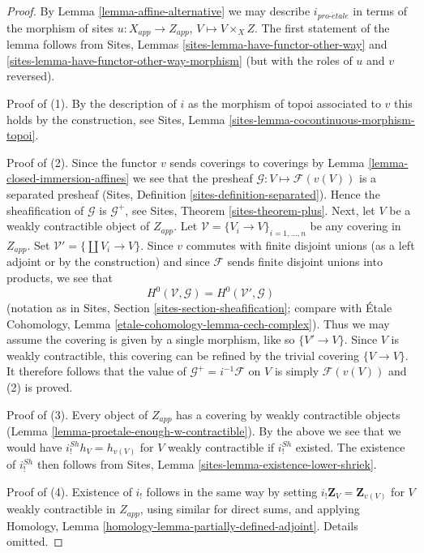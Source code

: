 \documentclass{stacks-project}
\theoremstyle{plain}
\theoremstyle{definition}
\theoremstyle{remark}
\numberwithin{equation}{subsection}
\def\proetale{{pro\text{-}\acute{e}tale}}
\begin{document}
\begin{proof}
By Lemma \ref{lemma-affine-alternative} we may describe $i_\proetale$ in terms
of the morphism of sites $u : X_{app} \to Z_{app}$, $V \mapsto V \times_X Z$.
The first statement of the lemma follows from
Sites, Lemmas \ref{sites-lemma-have-functor-other-way} and
\ref{sites-lemma-have-functor-other-way-morphism}
(but with the roles of $u$ and $v$ reversed).

\medskip\noindent
Proof of (1). By the description of $i$ as the morphism of topoi associated
to $v$ this holds by the construction, see
Sites, Lemma \ref{sites-lemma-cocontinuous-morphism-topoi}.

\medskip\noindent
Proof of (2). Since the functor $v$ sends coverings to coverings by
Lemma \ref{lemma-closed-immersion-affines} we see that the presheaf
$\mathcal{G} : V \mapsto \mathcal{F}(v(V))$ is a separated presheaf
(Sites, Definition \ref{sites-definition-separated}). Hence
the sheafification of $\mathcal{G}$ is $\mathcal{G}^+$, see
Sites, Theorem \ref{sites-theorem-plus}. Next, let $V$ be a weakly
contractible object of $Z_{app}$. Let
$\mathcal{V} = \{V_i \to V\}_{i = 1, \ldots, n}$
be any covering in $Z_{app}$. Set $\mathcal{V}' = \{\coprod V_i \to V\}$.
Since $v$ commutes with finite disjoint unions (as a left adjoint or by
the construction) and since $\mathcal{F}$ sends finite disjoint
unions into products, we see that
$$
H^0(\mathcal{V}, \mathcal{G}) = H^0(\mathcal{V}', \mathcal{G})
$$
(notation as in Sites, Section \ref{sites-section-sheafification};
compare with
\'Etale Cohomology, Lemma \ref{etale-cohomology-lemma-cech-complex}).
Thus we may assume the covering is given by a single morphism, like
so $\{V' \to V\}$. Since $V$ is weakly contractible, this covering
can be refined by the trivial covering $\{V \to V\}$.
It therefore follows that the value of $\mathcal{G}^+ = i^{-1}\mathcal{F}$
on $V$ is simply $\mathcal{F}(v(V))$ and (2) is proved.

\medskip\noindent
Proof of (3). Every object of $Z_{app}$ has a covering by weakly
contractible objects (Lemma \ref{lemma-proetale-enough-w-contractible}).
By the above we see that we would have $i^{Sh}_!h_V = h_{v(V)}$ for $V$
weakly contractible if $i^{Sh}_!$ existed. The existence of
$i^{Sh}_!$ then follows from
Sites, Lemma \ref{sites-lemma-existence-lower-shriek}.

\medskip\noindent
Proof of (4). Existence of $i_!$ follows in the same way by setting
$i_!\mathbf{Z}_V = \mathbf{Z}_{v(V)}$ for $V$ weakly contractible in $Z_{app}$,
using similar for direct sums, and applying
Homology, Lemma \ref{homology-lemma-partially-defined-adjoint}.
Details omitted.


\end{proof}
\end{document}
